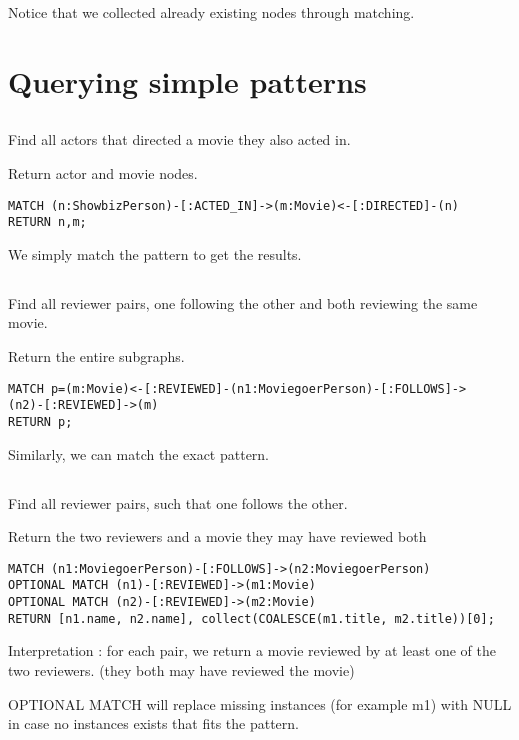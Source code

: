 Notice that we collected already existing nodes through matching.

\section{Querying simple patterns}
\subsection{}
Find all actors that directed a movie they also acted in.

Return actor and movie nodes.

\begin{verbatim}
MATCH (n:ShowbizPerson)-[:ACTED_IN]->(m:Movie)<-[:DIRECTED]-(n)
RETURN n,m;
\end{verbatim}

We simply match the pattern to get the results.

\subsection{}
Find all reviewer pairs, one following the other and both reviewing the same movie.

Return the entire subgraphs.

\begin{verbatim}
MATCH p=(m:Movie)<-[:REVIEWED]-(n1:MoviegoerPerson)-[:FOLLOWS]->
(n2)-[:REVIEWED]->(m)
RETURN p;
\end{verbatim}

Similarly, we can match the exact pattern.

\subsection{}
Find all reviewer pairs, such that one follows the other.

Return the two reviewers and a movie they may have reviewed both

\begin{verbatim}
MATCH (n1:MoviegoerPerson)-[:FOLLOWS]->(n2:MoviegoerPerson)
OPTIONAL MATCH (n1)-[:REVIEWED]->(m1:Movie)
OPTIONAL MATCH (n2)-[:REVIEWED]->(m2:Movie)
RETURN [n1.name, n2.name], collect(COALESCE(m1.title, m2.title))[0];
\end{verbatim}

Interpretation : for each pair, we return a movie reviewed by at least one of the two reviewers. (they both may have reviewed the movie)

OPTIONAL MATCH will replace missing instances (for example m1) with NULL in case no instances exists that fits the pattern.

